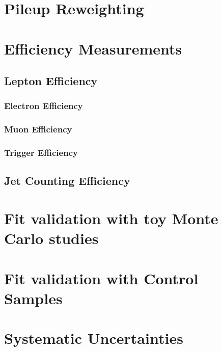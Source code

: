 \documentclass{cmspaper}
\begin{document}
\section{Pileup Reweighting}
     \label{sec:pileupReweighting}

\section{Efficiency Measurements}
     \label{sec:alleff}
     \subsection{Lepton Efficiency}
     \label{sec:efficiency}
	 \subsubsection{Electron Efficiency}
	 \label{sec:eff_electron}
	 \subsubsection{Muon Efficiency}
	 \label{sec:eff_muon}
	 \subsubsection{Trigger Efficiency}
	 \label{sec:eff_trigger}
     \subsection{Jet Counting Efficiency}

\section{Fit validation with toy Monte Carlo studies}

\section{Fit validation with Control Samples}


\section{Systematic Uncertainties}
   \label{sec:systematics}

\newpage 
\end{document}
